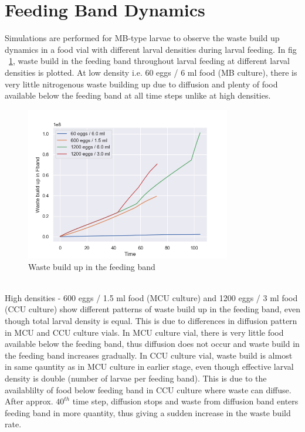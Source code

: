 \newpage
\section{Feeding Band Dynamics}
Simulations are performed for MB-type larvae to observe the waste build up dynamics in a food vial with different larval densities during larval feeding. In fig ~\ref{fig:waste}, waste build in the feeding band throughout larval feeding at different larval densities is plotted. At low density i.e. 60 eggs / 6 ml food (MB culture), there is very little nitrogenous waste building up due to diffusion and plenty of food available below the feeding band at all time steps unlike at high densities.
\begin{figure}[h]
  \centering
  \includegraphics[width=0.8\textwidth]{C2/Figs/waste_build_up}
  \caption{Waste build up in the feeding band}
  \label{fig:waste}
\end{figure}\\
High densities - 600 eggs / 1.5 ml food (MCU culture) and 1200 eggs / 3 ml food (CCU culture) show different patterns of waste build up in the feeding band, even though total larval density is equal. This is due to differences in diffusion pattern in MCU and CCU culture vials. In MCU culture vial, there is very little food available below the feeding band, thus diffusion does not occur and waste build in the feeding band increases gradually. In CCU culture vial, waste build is almost in same qauntity as in MCU culture in earlier stage, even though effective larval density is double (number of larvae per feeding band). This is due to the availablilty of food below feeding band in CCU culture where waste can diffuse. After approx. $40^{th}$ time step, diffusion stops and waste from diffusion band enters feeding band in more quantity, thus giving a sudden increase in the waste build rate. \\ \\
